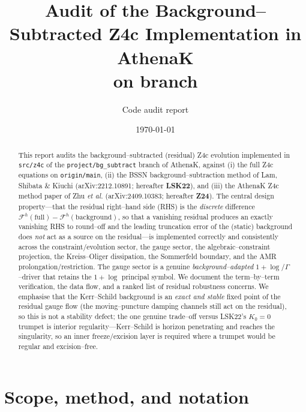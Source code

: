 \documentclass[11pt]{article}
\title{\bfseries Audit of the Background--Subtracted Z4c Implementation in
AthenaK\\[2pt]
\large \file{src/z4c} on branch \file{project/bg\_subtract}}
\author{Code audit report}
\date{\today}
\newcommand{\file}[1]{\texttt{#1}}
\newcommand{\Fop}{\mathcal{F}}            %
\newcommand{\Fnum}{\Fop^{h}}              %
\begin{document}
\maketitle

\begin{abstract}
This report audits the background--subtracted (residual) Z4c evolution
implemented in \file{src/z4c} of the \file{project/bg\_subtract} branch of
AthenaK, against (i) the full Z4c equations on \file{origin/main}, (ii) the
BSSN background--subtraction method of Lam, Shibata \& Kiuchi
(arXiv:2212.10891; hereafter \textbf{LSK22}), and (iii) the AthenaK Z4c method
paper of Zhu \emph{et al.} (arXiv:2409.10383; hereafter \textbf{Z24}). The
central design property---that the residual right--hand side (RHS) is the
\emph{discrete} difference $\Fnum(\text{full})-\Fnum(\text{background})$, so
that a vanishing residual produces an exactly vanishing RHS to round--off and
the leading truncation error of the (static) background does \emph{not} act as
a source on the residual---is implemented correctly and consistently across
the constraint/evolution sector, the gauge sector, the algebraic--constraint
projection, the Kreiss--Oliger dissipation, the Sommerfeld boundary, and the
AMR prolongation/restriction. The gauge sector is a genuine
\emph{background--adapted} $1+\log$/$\Gamma$--driver that retains the
$1+\log$ principal symbol. We document the term--by--term verification, the
data flow, and a ranked list of residual robustness concerns. We emphasise that
the Kerr--Schild background is an \emph{exact and stable} fixed point of the
residual gauge flow (the moving--puncture damping channels still act on the
residual), so this is not a stability defect; the one genuine trade--off versus
LSK22's $K_0=0$ trumpet is interior regularity---Kerr--Schild is horizon
penetrating and reaches the singularity, so an inner freeze/excision layer is
required where a trumpet would be regular and excision--free.
\end{abstract}

\tableofcontents

\section{Scope, method, and notation}
\end{document}
